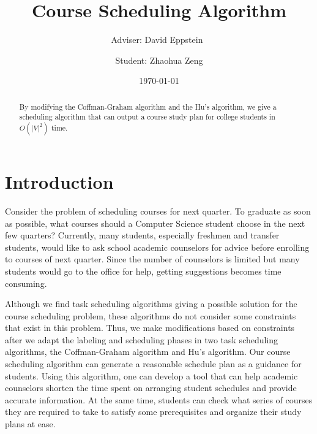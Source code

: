 \documentclass[letterpaper,12pt]{article}
\title{Course Scheduling Algorithm}
\author{Adviser: David Eppstein\
\and Student: Zhaohua Zeng}
\date{\today}
\theoremstyle{definition}
\begin{document}











\maketitle

\tableofcontents
\newpage
\begin{abstract}
	By modifying the Coffman-Graham algorithm and the Hu’s algorithm, we give a scheduling algorithm that can output a course study plan for college students in $O(|V|^2)$ time. 
\end{abstract}
\section{Introduction}
Consider the problem of scheduling courses for next quarter. To graduate as soon as possible, what courses should a Computer Science student choose in the next few quarters? Currently, many students, especially freshmen and transfer students, would like to ask school academic counselors for advice before enrolling to courses of next quarter. Since the number of counselors is limited but many students would go to the office for help, getting suggestions becomes time consuming. 

Although we find task scheduling algorithms giving a possible solution for the course scheduling problem, these algorithms do not consider some constraints that exist in this problem. Thus, we make modifications based on constraints after we adapt the labeling and scheduling phases in two task scheduling algorithms, the Coffman-Graham algorithm and Hu's algorithm. Our course scheduling algorithm can generate a reasonable schedule plan as a guidance for students. Using this algorithm, one can develop a tool that can help academic counselors shorten the time spent on arranging student schedules and provide accurate information. At the same time, students can check what series of courses they are required to take to satisfy some prerequisites and organize their study plans at ease.
\end{document}
